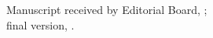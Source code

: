\documentclass{amestyle}
\begin{document}
\begin{receiptnote}
  Manuscript received by Editorial Board, \theamereceived; \\ 
  final version, \theameaccepted.
\end{receiptnote}



%
%

%
%

\end{document}
